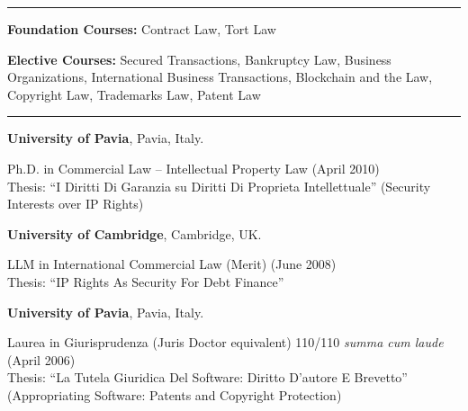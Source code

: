 \documentclass[
  11pt,
  letterpaper]{article}
\begin{document}
\vspace{0.25em}\hrule\vspace{0.7em}

\noindent\textbf{Foundation Courses:} Contract Law, Tort Law

\vspace{0.3em}

\noindent\textbf{Elective Courses:} Secured Transactions, Bankruptcy
Law, Business Organizations, International Business Transactions,
Blockchain and the Law, Copyright Law, Trademarks Law, Patent Law

\vspace{0.25em}\hrule\vspace{0.7em}

\noindent\textbf{University of Pavia}, Pavia, Italy.

\bgroup \par\leftskip=0.5in\parskip=0pt\parindent=0pt
Ph.D. in Commercial Law -- Intellectual Property Law (April 2010)\\
Thesis: ``I Diritti Di Garanzia su Diritti Di Proprieta Intellettuale'' (Security Interests over IP Rights)
\par\leftskip=0pt\egroup

\vspace{0.8em}\noindent\textbf{University of Cambridge}, Cambridge, UK.

\bgroup \par\leftskip=0.5in\parskip=0pt\parindent=0pt
LLM in International Commercial Law (Merit) (June 2008)\\
Thesis: ``IP Rights As Security For Debt Finance''
\par\leftskip=0pt\egroup

\vspace{0.8em}\noindent\textbf{University of Pavia}, Pavia, Italy.

\bgroup \par\leftskip=0.5in\parskip=0pt\parindent=0pt
Laurea in Giurisprudenza (Juris Doctor equivalent) 110/110 \textit{summa cum laude} (April 2006)\\
Thesis: ``La Tutela Giuridica Del Software: Diritto D'autore E Brevetto'' (Appropriating Software: Patents and Copyright Protection)
\par\leftskip=0pt\egroup
\end{document}

